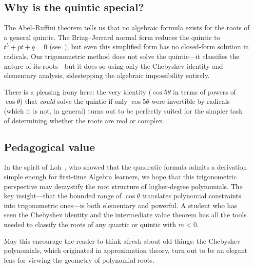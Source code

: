\documentclass[12pt]{article}
\theoremstyle{definition}
\theoremstyle{remark}
\begin{document}
\subsection{Why is the quintic special?}

The Abel--Ruffini theorem tells us that no algebraic formula exists for the roots of a general quintic. The Bring--Jerrard normal form reduces the quintic to $t^5 + pt + q = 0$ (see~\cite{King2009}), but even this simplified form has no closed-form solution in radicals. Our trigonometric method does not solve the quintic---it classifies the nature of its roots---but it does so using only the Chebyshev identity and elementary analysis, sidestepping the algebraic impossibility entirely.

There is a pleasing irony here: the very identity ($\cos 5\theta$ in terms of powers of $\cos\theta$) that \emph{could} solve the quintic if only $\cos 5\theta$ were invertible by radicals (which it is not, in general) turns out to be perfectly suited for the simpler task of determining whether the roots are real or complex.

\subsection{Pedagogical value}

In the spirit of Loh~\cite{Loh2019}, who showed that the quadratic formula admits a derivation simple enough for first-time Algebra learners, we hope that this trigonometric perspective may demystify the root structure of higher-degree polynomials. The key insight---that the bounded range of $\cos\theta$ translates polynomial constraints into trigonometric ones---is both elementary and powerful. A student who has seen the Chebyshev identity and the intermediate value theorem has all the tools needed to classify the roots of any quartic or quintic with $m < 0$.

May this encourage the reader to think afresh about old things: the Chebyshev polynomials, which originated in approximation theory, turn out to be an elegant lens for viewing the geometry of polynomial roots.
\end{document}

